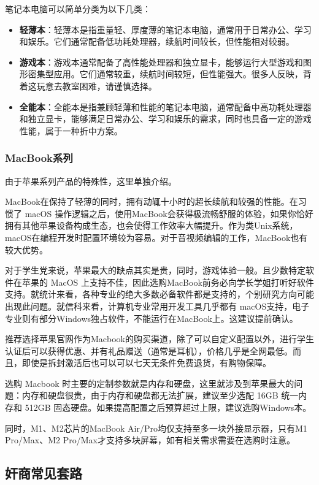 \documentclass[../main.tex]{subfiles}
\begin{document}
笔记本电脑可以简单分类为以下几类：

\begin{itemize}
  \item \textbf{轻薄本}：轻薄本是指重量轻、厚度薄的笔记本电脑，通常用于日常办公、学习和娱乐。它们通常配备低功耗处理器，续航时间较长，但性能相对较弱。
  \item \textbf{游戏本}：游戏本通常配备了高性能处理器和独立显卡，能够运行大型游戏和图形密集型应用。它们通常较重，续航时间较短，但性能强大。很多人反映，背着这玩意去教室困难，请谨慎选择。
  \item \textbf{全能本}：全能本是指兼顾轻薄和性能的笔记本电脑，通常配备中高功耗处理器和独立显卡，能够满足日常办公、学习和娱乐的需求，同时也具备一定的游戏性能，属于一种折中方案。
\end{itemize}

\subsubsection{MacBook系列}
由于苹果系列产品的特殊性，这里单独介绍。

MacBook在保持了轻薄的同时，拥有动辄十小时的超长续航和较强的性能。在习惯了 macOS 操作逻辑之后，使用MacBook会获得极流畅舒服的体验，如果你恰好拥有其他苹果设备构成生态，也会使得工作效率大幅提升。作为类Unix系统，macOS在编程开发时配置环境较为容易。对于音视频编辑的工作，MacBook也有较大优势。

对于学生党来说，苹果最大的缺点其实是贵，同时，游戏体验一般。且少数特定软件在苹果的 MacOS 上支持不佳，因此选购MacBook前务必向学长学姐打听好软件支持。就统计来看，各种专业的绝大多数必备软件都是支持的，个别研究方向可能出现此问题。就信科来看，计算机专业常用开发工具几乎都有 macOS支持，电子专业则有部分Windows独占软件，不能运行在MacBook上。这建议提前确认。

推荐选择苹果官网作为Macbook的购买渠道，除了可以自定义配置以外，进行学生认证后可以获得优惠、并有礼品赠送（通常是耳机），价格几乎是全网最低。而且，即使是拆封激活后也可以可以七天无条件免费退货，有购物保障。

选购 Macbook 时主要的定制参数就是内存和硬盘，这里就涉及到苹果最大的问题：内存和硬盘很贵，由于内存和硬盘都无法扩展，建议至少选配 16GB 统一内存和 512GB 固态硬盘。如果提高配置之后预算超过上限，建议选购Windows本。

同时，M1、M2芯片的MacBook Air/Pro均仅支持至多一块外接显示器，只有M1 Pro/Max、M2 Pro/Max才支持多块屏幕，如有相关需求需要在选购时注意。

\subsection{奸商常见套路}
\end{document}
